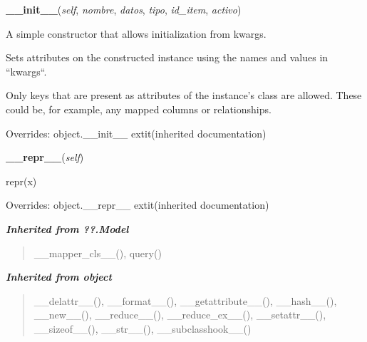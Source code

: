 \hspace{.8\funcindent}\begin{boxedminipage}{\funcwidth}

    \raggedright \textbf{\_\_init\_\_}(\textit{self}, \textit{nombre}, \textit{datos}, \textit{tipo}, \textit{id\_item}, \textit{activo})

\setlength{\parskip}{2ex}
    A simple constructor that allows initialization from kwargs.

    Sets attributes on the constructed instance using the names and values 
    in ``kwargs``.

    Only keys that are present as attributes of the instance's class are 
    allowed. These could be, for example, any mapped columns or 
    relationships.

\setlength{\parskip}{1ex}
      Overrides: object.\_\_init\_\_ 	extit{(inherited documentation)}

    \end{boxedminipage}

    \vspace{0.5ex}

\hspace{.8\funcindent}\begin{boxedminipage}{\funcwidth}

    \raggedright \textbf{\_\_repr\_\_}(\textit{self})

\setlength{\parskip}{2ex}
    repr(x)

\setlength{\parskip}{1ex}
      Overrides: object.\_\_repr\_\_ 	extit{(inherited documentation)}

    \end{boxedminipage}


\large{\textbf{\textit{Inherited from ??.Model}}}

\begin{quote}
\_\_mapper\_cls\_\_(), query()
\end{quote}

\large{\textbf{\textit{Inherited from object}}}

\begin{quote}
\_\_delattr\_\_(), \_\_format\_\_(), \_\_getattribute\_\_(), \_\_hash\_\_(), \_\_new\_\_(), \_\_reduce\_\_(), \_\_reduce\_ex\_\_(), \_\_setattr\_\_(), \_\_sizeof\_\_(), \_\_str\_\_(), \_\_subclasshook\_\_()
\end{quote}


